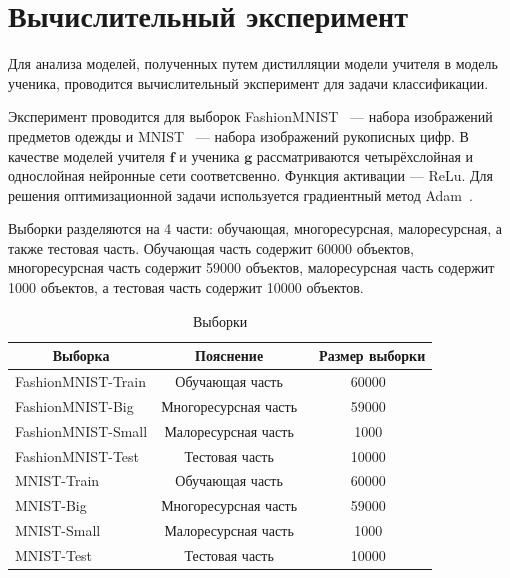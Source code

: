 \newpage

\section{Вычислительный эксперимент}

Для анализа моделей, полученных путем дистилляции модели учителя в модель ученика, проводится вычислительный эксперимент для задачи классификации.

Эксперимент проводится для выборок FashionMNIST~\cite{FMNIST} --- набора изображений предметов одежды и MNIST~\cite{MNIST} --- набора изображений рукописных цифр. В качестве моделей учителя $\textbf{f}$ и ученика $\textbf{g}$ рассматриваются четырёхслойная и однослойная нейронные сети соответсвенно. Функция активации --- ReLu. Для решения оптимизационной задачи используется градиентный метод Adam~\cite{Adam}.

Выборки разделяются на 4 части: обучающая, многоресурсная, малоресурсная, а также тестовая часть. Обучающая часть содержит 60000 объектов, многоресурсная часть содержит 59000 объектов, малоресурсная часть содержит 1000 объектов, а тестовая часть содержит 10000 объектов.

\begin{table}[h!t]
\begin{center}
\caption{Выборки}
\label{table_1}
\begin{tabular}{|c|c|c|}
\hline
	Выборка & Пояснение &\ Размер выборки\\
	\hline
	\multicolumn{1}{|l|}{FashionMNIST-Train}
	& Обучающая часть& 60000\\
	\hline
	\multicolumn{1}{|l|}{FashionMNIST-Big}
	& Многоресурсная часть& 59000\\
	\hline
	\multicolumn{1}{|l|}{FashionMNIST-Small}
	& Малоресурсная часть& 1000\\
	\hline
	\multicolumn{1}{|l|}{FashionMNIST-Test}
	& Тестовая часть& 10000\\
	\hline
	\multicolumn{1}{|l|}{MNIST-Train}
	& Обучающая часть& 60000\\
	\hline
	\multicolumn{1}{|l|}{MNIST-Big}
	& Многоресурсная часть& 59000\\
	\hline
	\multicolumn{1}{|l|}{MNIST-Small}
	& Малоресурсная часть& 1000\\
	\hline
	\multicolumn{1}{|l|}{MNIST-Test}
	& Тестовая часть& 10000\\
\hline

\end{tabular}
\end{center}
\end{table}

